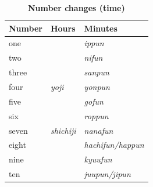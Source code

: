 \documentclass{proc}
\newcommand{\tab}[3][|r|l|]{
    {   %
        \begin{table}[H] %
        \caption*{\textbf{#2}}
        \vspace{-0.3cm} %
        \centering
        \begin{tabular}{#1}%
        \hline
        #3
        \end{tabular}
        \end{table}
    }
}
\begin{document}
{\tab[|l|l|l|]{Number changes (time)}{
Number& Hours            & Minutes                  \\\hline
one   &                  & \textit{ippun}           \\\hline
two   &                  & \textit{nifun}           \\\hline
three &                  & \textit{sanpun}          \\\hline
four  &\textit{yoji}     & \textit{yonpun}          \\\hline
five  &                  & \textit{gofun}           \\\hline
six   &                  & \textit{roppun}          \\\hline
seven &\textit{shichiji} &\textit{nanafun}         \\\hline
eight &                  & \textit{hachifun/happun} \\\hline
nine  &                  & \textit{kyuufun}         \\\hline
ten   &                  & \textit{juupun/jipun}    \\\hline
}

}
\end{document}
